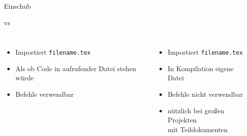 \documentclass[14pt,aspectratio=169]{beamer}
\begin{document}
\begin{frame}{Einschub}	
	\begin{exampleblock}{\texttt{} vs \texttt{}}
		\begin{columns}[t]
			
			\begin{itemize}
				\item Importiert \texttt{filename.tex}
				\item Als ob Code in aufrufender Datei stehen würde
				\item Befehle verwendbar
			\end{itemize}
			
			
			\begin{itemize}
				\item Importiert \texttt{filename.tex}
				\item In Kompilation eigene Datei
				\item Befehle nicht verwendbar
	       		\item nützlich bei großen Projekten \\
    				  mit Teildokumenten
			\end{itemize}
		\end{columns}
        \vspace{1em}
        
	\end{exampleblock}	
\end{frame}
\end{document}

